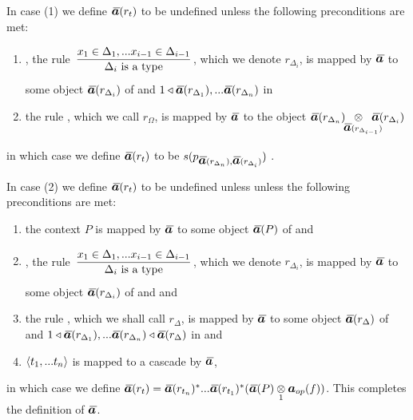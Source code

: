 \begin{definition} 
\begin{enumerate}[(i)]
In  case (1) we define $\Ibar(r_t)$ to be undefined unless  the following preconditions are met:
\begin{enumerate}
\item
\foreachi, the rule $\IDelta{i}$, which we denote $r_{\Delta_i}$, is mapped by $\Ibar$ to some object $\Ibar(r_{\Delta_i})$ of \catcw
and $1 \base \Ibar(r_{\Delta_1}),...\Ibar(r_{\Delta_n})$ in \catcw 
\item the rule , which we call $r_\Omega$, 
is mapped by $\Ibar$ to the object $\crossx{\Ibar(r_{\Delta_n})}{\Ibar(r_{\Delta_i})}{\kern-4pt\Ibar(r_{\Delta_{i-1}})\kern-12pt}$
\end{enumerate}
in which case we define $\Ibar(r_t)$ to be $s(p_{\Ibar(r_{\Delta_n}),\Ibar(r_{\Delta_i})})$ . 

In  case (2) 
we define $\Ibar(r_t)$ to be undefined unless  unless the following preconditions are met:
\begin{enumerate}
\item
the context  $P$ is mapped by $\Ibar$ to some object $\Ibar(P)$ of \catcw and 
\item
\foreachi, the rule $\IDelta{i}$, which we denote $r_{\Delta_i}$, is mapped by $\Ibar$ to some object $\Ibar(r_{\Delta_i})$ of \catcw
and  
and 
\item the rule \ZDelta, which we shall call $r_\Delta$, is mapped by $\Ibar$ to some object $\Ibar(r_\Delta)$ of \catcw and
$1 \base \Ibar(r_{\Delta_1}),...\Ibar(r_{\Delta_n}) \base \Ibar(r_\Delta)$ in \catcw 
and 
\item
$\langle t_1,...t_n\rangle$ is mapped to a cascade by $\Ibar$,
\end{enumerate}
in which case we
define $\Ibar(r_t)=\Ibar(r_{t_n})^*...\Ibar(r_{t_1})^*(\crossx{\Ibar(P)}{\iI_{op}(f)}{1})$.
This completes the definition of $\Ibar$.
\end{enumerate}
\end{definition}


\def\restrict{\mathbin{\restriction}}
\newcommand{\predInstance}{\overline{I \restrict U_p}}
\newcommand{\Uincrement}{U \setminus\kern-2pt U_p}

